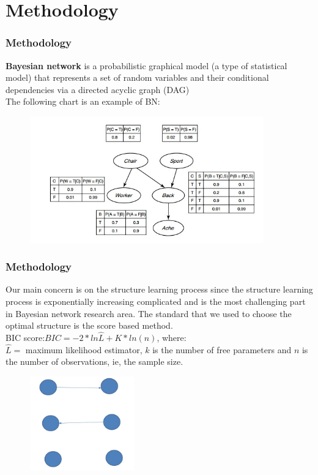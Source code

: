\documentclass{beamer}
\begin{document}
\section{Methodology}
\begin{frame}
\frametitle{Methodology}
\textbf{Bayesian network} is a probabilistic graphical model (a type of statistical model)
that represents a set of random variables and their conditional dependencies via a directed acyclic graph (DAG)\\
The following chart is an example of BN:\\
 \begin{figure}
     \includegraphics[width=0.9\textwidth]{bayesian.jpg}

    \end{figure}

\end{frame}

\begin{frame}

\frametitle{Methodology}
Our main concern is on the structure learning process since the structure learning process is exponentially increasing complicated and is the most challenging part in Bayesian network research area. The standard that we used to choose the optimal structure is the score based method.\\
\vspace{2ex}
BIC score:$BIC=-2*ln\hat{L}+K*ln(n)$, where:\\
\vspace{2ex}
$\hat{L}=$ maximum likelihood estimator, $k$ is the number of free parameters and $n$ is the number of observations, ie, the sample size.
 \begin{figure}
     \includegraphics[width=0.4\textwidth, height=0.4\textheight]{learning.jpg}

    \end{figure}
\end{frame}
\end{document}
